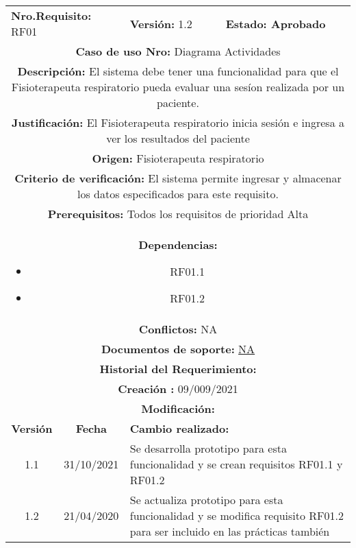 \begin{center}
        \begin{tabular}{|c|c|p{4cm}|p{4cm}|}
            \hline
            \rowcolor{red} \multicolumn{4}{|c|}{\textbf{Prioridad:} Alta}  \\
            \hline
            \multicolumn{2}{|l}{\textbf{Nro.Requisito: }RF01} & \multicolumn{1}{l|}{\textbf{Versión: }1.2}  & \multicolumn{1}{|l|}{\textbf{Estado: Aprobado}} \\
            \multicolumn{4}{|p{12cm}|}{\textbf{Caso de uso Nro: } %
            Diagrama Actividades}  \\
            \hline
            \multicolumn{4}{|p{13cm}|}{\textbf{Descripción: }El  sistema  debe  tener  una  funcionalidad  para  que el  Fisioterapeuta respiratorio pueda evaluar una sesíon realizada por un paciente.}  \\
            \multicolumn{4}{|p{13cm}|}{\textbf{Justificación: }El Fisioterapeuta respiratorio inicia sesión e ingresa a ver los resultados del paciente}  \\
            \multicolumn{4}{|p{12cm}|}{\textbf{Origen: }Fisioterapeuta respiratorio}  \\
            \multicolumn{4}{|p{13cm}|}{\textbf{Criterio de verificación: }El sistema permite ingresar y almacenar los datos especificados para este requisito.}  \\
            \hline
           \multicolumn{4}{|p{13cm}|}{\textbf{Prerequisitos: }Todos los requisitos de prioridad Alta}  \\
            \hline \multicolumn{4}{|p{12cm}|}{\textbf{Dependencias: }
                \begin{itemize}
                    \item RF01.1
                    \item RF01.2
                \end{itemize}}  \\
            \multicolumn{4}{|p{13cm}|}{\textbf{Conflictos: }NA}  \\
            \hline
            \multicolumn{4}{|p{12cm}|}{\textbf{Documentos de soporte: }\hyperlink{HCN}{NA} }  \\
            \hline
            \multicolumn{4}{|p{12cm}|}{\textbf{Historial del Requerimiento: }}  \\
            \multicolumn{4}{|p{12cm}|}{\textbf{Creación : }09/009/2021}  \\
            \multicolumn{4}{|p{12cm}|}{\textbf{Modificación: }}  \\
             \textbf{Versión} & \textbf{Fecha} & \multicolumn{2}{p{8cm}|}{\textbf{Cambio realizado:}} \\
            \hline
             1.1    &31/10/2021 &   \multicolumn{2}{p{9cm}|}{Se desarrolla prototipo para esta funcionalidad y se crean requisitos RF01.1 y RF01.2}
              \\
      
            \hline
             1.2    &21/04/2020 &   \multicolumn{2}{p{9cm}|}{Se actualiza prototipo para esta funcionalidad y se modifica requisito RF01.2 para ser incluido en las prácticas también}
              \\
            \hline
        \end{tabular}
\end{center} 